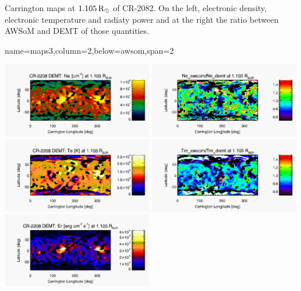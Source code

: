 \documentclass[paperwidth=100cm,paperheight=120cm]{baposter}
\def\azul#1{\textcolor{blue}{#1}}
\begin{document}
\begin{poster}
{\begin{center}
\end{center}
\vskip -0.16cm
{\footnotesize\sf
Carrington maps at $1.105\, {\rm R}_\odot$ of CR-2082. On the left, electronic density, electronic temperature and radiaty power and at the right the ratio between AWSoM and DEMT of those quantities.
}
}

{name=maps3,column=2,below=awsom,span=2}{
{\footnotesize\sf
\begin{center}
{\includegraphics[width=0.49\textwidth]{map_Ne_CR2208_DEMT-AIA_H1_L522_r3d_1105_Rsun.pdf}}
{\includegraphics[width=0.49\textwidth]{map_ratio_Ne_awsom_2208_185-Ne_CR2208_DEMT-AIA_H1_L522_r3d_1105_Rsun.pdf}}
{\includegraphics[width=0.49\textwidth]{map_Tm_CR2208_DEMT-AIA_H1_L522_r3d_1105_Rsun.pdf}}
{\includegraphics[width=0.49\textwidth]{map_ratio_Te_awsom_2208_185-Tm_CR2208_DEMT-AIA_H1_L522_r3d_1105_Rsun.pdf}}
{\includegraphics[width=0.49\textwidth]{map_Er_CR2208_DEMT-EUVI_behind_H1-L502020_r3d_1105_Rsun.pdf}}

\end{center}}}
\end{poster}
\end{document}
